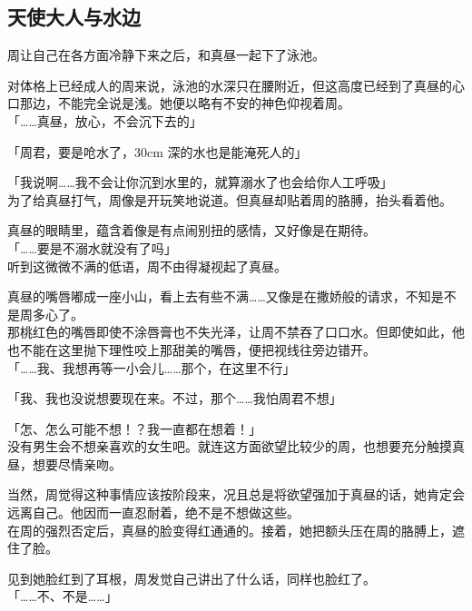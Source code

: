 \subsection{天使大人与水边}

周让自己在各方面冷静下来之后，和真昼一起下了泳池。

对体格上已经成人的周来说，泳池的水深只在腰附近，但这高度已经到了真昼的心口那边，不能完全说是浅。她便以略有不安的神色仰视着周。\\

「……真昼，放心，不会沉下去的」

「周君，要是呛水了，30cm 深的水也是能淹死人的」

「我说啊……我不会让你沉到水里的，就算溺水了也会给你人工呼吸」\\

为了给真昼打气，周像是开玩笑地说道。但真昼却贴着周的胳膊，抬头看着他。

真昼的眼睛里，蕴含着像是有点闹别扭的感情，又好像是在期待。\\

「……要是不溺水就没有了吗」\\

听到这微微不满的低语，周不由得凝视起了真昼。

真昼的嘴唇嘟成一座小山，看上去有些不满……又像是在撒娇般的请求，不知是不是周多心了。\\

那桃红色的嘴唇即使不涂唇膏也不失光泽，让周不禁吞了口口水。但即使如此，他也不能在这里抛下理性咬上那甜美的嘴唇，便把视线往旁边错开。\\

「……我、我想再等一小会儿……那个，在这里不行」

「我、我也没说想要现在来。不过，那个……我怕周君不想」

「怎、怎么可能不想！？我一直都在想着！」\\

没有男生会不想亲喜欢的女生吧。就连这方面欲望比较少的周，也想要充分触摸真昼，想要尽情亲吻。

当然，周觉得这种事情应该按阶段来，况且总是将欲望强加于真昼的话，她肯定会远离自己。他因而一直忍耐着，绝不是不想做这些。\\

在周的强烈否定后，真昼的脸变得红通通的。接着，她把额头压在周的胳膊上，遮住了脸。

见到她脸红到了耳根，周发觉自己讲出了什么话，同样也脸红了。\\

「……不、不是……」

